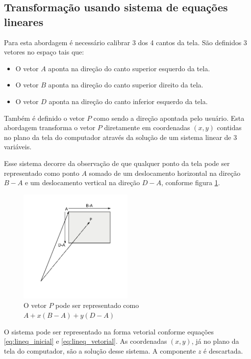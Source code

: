 \documentclass[brazil,pagestart=firstchapter]{abnt}
\begin{document}
\subsection{Transformação usando sistema de equações lineares}
\label{sub:coord_lineq}

Para esta abordagem é necessário calibrar 3 dos 4 cantos da tela. São
definidos 3 vetores no espaço tais que:

\begin{itemize}
\item O vetor $A$ aponta na direção do canto superior esquerdo da tela.
\item O vetor $B$ aponta na direção do canto superior direito da tela.
\item O vetor $D$ aponta na direção do canto inferior esquerdo da tela.
\end{itemize}

Também é definido o vetor $P$ como sendo a direção apontada pelo usuário.
Esta abordagem transforma o vetor $P$ diretamente em coordenadas $(x, y)$
contidas no plano da tela do computador através da solução de um sistema
linear de 3 variáveis.

Esse sistema decorre da observação de que qualquer ponto da tela pode ser
representado como ponto $A$ somado de um deslocamento horizontal na direção
$B-A$ e um deslocamento vertical na direção $D-A$, conforme figura
\ref{fig:lineq}.

\begin{figure}[h]
\centering
\includegraphics[width=0.5\textwidth]{img/lineq.pdf}
\caption{O vetor $P$ pode ser representado como $A + x(B-A) + y(D-A)$}
\label{fig:lineq}
\end{figure}

O sistema pode ser representado na forma vetorial conforme equações
\eqref{eq:lineq_inicial} e \eqref{eq:lineq_vetorial}. As coordenadas $(x,
y)$, já no plano da tela do computador, são a solução desse sistema. A
componente $z$ é descartada.
\end{document}
